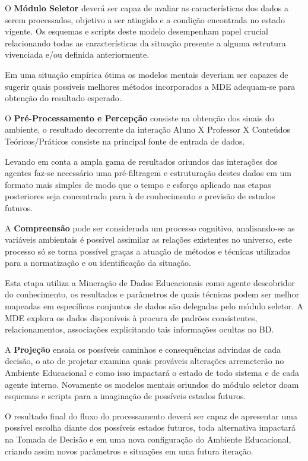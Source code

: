 \documentclass[12pt]{article}
\begin{document}
O \textbf{Módulo Seletor} deverá ser capaz de avaliar as características dos dados a serem processados, objetivo a ser atingido e a condição encontrada no estado vigente. Os esquemas e scripts deste modelo desempenham papel crucial relacionando todas as características da situação presente a alguma estrutura vivenciada e/ou definida anteriormente. 

Em uma situação empírica ótima os modelos mentais deveriam ser capazes de sugerir quais possíveis melhores métodos incorporados a MDE adequam-se para obtenção do resultado esperado.  

O \textbf{Pré-Processamento e Percepção} consiste na obtenção dos sinais do ambiente, o resultado decorrente da interação Aluno X Professor X Conteúdos Teóricos/Práticos consiste na principal fonte de entrada de dados. 

Levando em conta a ampla gama de resultados oriundos das interações dos agentes faz-se necessário uma pré-filtragem e estruturação destes dados em um formato mais simples de modo que o tempo e esforço aplicado nas etapas posteriores seja concentrado para à de conhecimento e previsão de estados futuros. 

A \textbf{Compreensão} pode ser considerada um processo cognitivo, analisando-se as variáveis ambientais é possível assimilar as relações existentes no universo, este processo só se torna possível graças a atuação de métodos e técnicas utilizados para a normatização e ou identificação da situação.

Esta etapa utiliza a Mineração de Dados Educacionais como agente descobridor do conhecimento, os resultados e parâmetros de quais técnicas podem ser melhor mapeadas em específicos conjuntos de dados são delegadas pelo módulo seletor. A MDE explora os dados disponíveis à procura de padrões consistentes, relacionamentos, associações explicitando tais informações ocultas no BD.

A \textbf{Projeção} ensaia os possíveis caminhos e consequências advindas de cada decisão, o ato de projetar examina quais prováveis alterações arremeterão no Ambiente Educacional e como isso impactará o estado de todo sistema e de cada agente interno. Novamente os modelos mentais oriundos do módulo seletor doam esquemas e scripts para a imaginação de possíveis estados futuros.

O resultado final do fluxo do processamento deverá ser capaz de apresentar uma possível escolha diante dos possíveis estados futuros, toda alternativa impactará na Tomada de Decisão e em uma nova configuração do Ambiente Educacional, criando assim novos parâmetros e situações em uma futura iteração.
\end{document}
